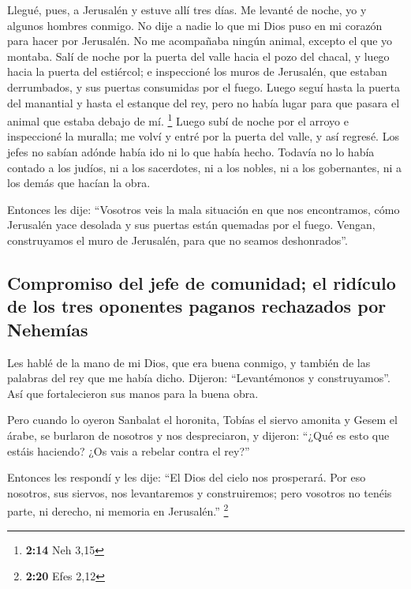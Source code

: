 \begin{paracol}{2}
 Llegué, pues, a Jerusalén y estuve allí tres días.
 Me levanté de noche, yo y algunos hombres conmigo. No
dije a nadie lo que mi Dios puso en mi corazón para hacer por Jerusalén.
No me acompañaba ningún animal, excepto el que yo montaba.
 Salí de noche por la puerta del valle hacia el pozo del
chacal, y luego hacia la puerta del estiércol; e inspeccioné los muros
de Jerusalén, que estaban derrumbados, y sus puertas consumidas por el
fuego.  Luego seguí hasta la puerta del manantial y hasta
el estanque del rey, pero no había lugar para que pasara el animal que
estaba debajo de mí. \footnote{\textbf{2:14} Neh 3,15} 
Luego subí de noche por el arroyo e inspeccioné la muralla; me volví y
entré por la puerta del valle, y así regresé.  Los jefes
no sabían adónde había ido ni lo que había hecho. Todavía no lo había
contado a los judíos, ni a los sacerdotes, ni a los nobles, ni a los
gobernantes, ni a los demás que hacían la obra.

 Entonces les dije: ``Vosotros veis la mala situación en
que nos encontramos, cómo Jerusalén yace desolada y sus puertas están
quemadas por el fuego. Vengan, construyamos el muro de Jerusalén, para
que no seamos deshonrados''.

\hypertarget{compromiso-del-jefe-de-comunidad-el-riduxedculo-de-los-tres-oponentes-paganos-rechazados-por-nehemuxedas}{%
\subsection{Compromiso del jefe de comunidad; el ridículo de los tres
oponentes paganos rechazados por
Nehemías}\label{compromiso-del-jefe-de-comunidad-el-riduxedculo-de-los-tres-oponentes-paganos-rechazados-por-nehemuxedas}}

 Les hablé de la mano de mi Dios, que era buena conmigo,
y también de las palabras del rey que me había dicho. Dijeron:
``Levantémonos y construyamos''. Así que fortalecieron sus manos para la
buena obra.

 Pero cuando lo oyeron Sanbalat el horonita, Tobías el
siervo amonita y Gesem el árabe, se burlaron de nosotros y nos
despreciaron, y dijeron: ``¿Qué es esto que estáis haciendo? ¿Os vais a
rebelar contra el rey?''

 Entonces les respondí y les dije: ``El Dios del cielo
nos prosperará. Por eso nosotros, sus siervos, nos levantaremos y
construiremos; pero vosotros no tenéis parte, ni derecho, ni memoria en
Jerusalén.'' \footnote{\textbf{2:20} Efes 2,12}


\end{paracol}
